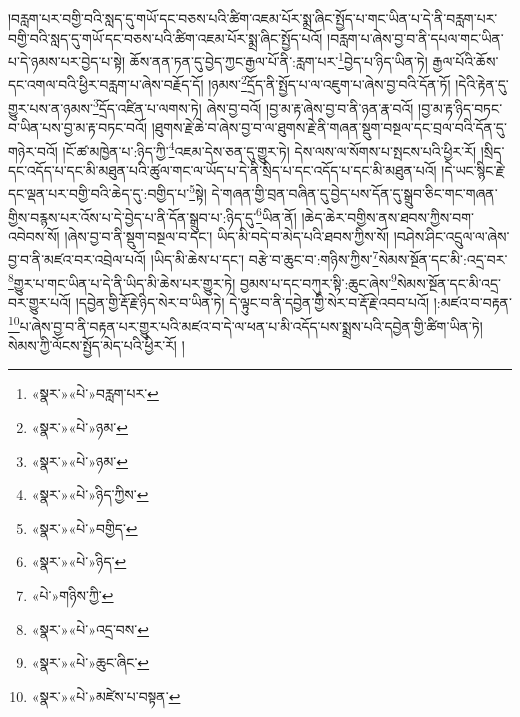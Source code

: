།བརླག་པར་བགྱི་བའི་སླད་དུ་གཡོ་དང་བཅས་པའི་ཚིག་འཇམ་པོར་སྨྲ་ཞིང་སྤྱོད་པ་གང་ཡིན་པ་དེ་ནི་བརླག་པར་བགྱི་བའི་སླད་དུ་གཡོ་དང་བཅས་པའི་ཚིག་འཇམ་པོར་སྨྲ་ཞིང་སྤྱོད་པའོ། །བརླག་པ་ཞེས་བྱ་བ་ནི་དཔལ་གང་ཡིན་པ་དེ་ཉམས་པར་བྱེད་པ་སྟེ། ཆོས་ནན་ཏན་དུ་བྱེད་ཀྱང་རྒྱལ་པོ་ནི་:རླག་པར་\footnote{«སྣར་»«པེ་»བརླག་པར་}བྱེད་པ་ཉིད་ཡིན་ཏེ། རྒྱལ་པོའི་ཆོས་དང་འགལ་བའི་ཕྱིར་བརླག་པ་ཞེས་བརྗོད་དོ། །ཉམས་\footnote{«སྣར་»«པེ་»ཉམ་}དྲོད་ནི་སྤྱོད་པ་ལ་འཇུག་པ་ཞེས་བྱ་བའི་དོན་ཏོ། །དེའི་རྟེན་དུ་གྱུར་པས་ན་ཉམས་\footnote{«སྣར་»«པེ་»ཉམ་}དྲོད་འཛིན་པ་ལགས་ཏེ། ཞེས་བྱ་བའོ། །བྱ་མ་རྟ་ཞེས་བྱ་བ་ནི་ཉན་རྣ་བའོ། །བྱ་མ་རྟ་ཉིད་བཏང་བ་ཡིན་པས་བྱ་མ་རྟ་བཏང་བའོ། །ཐུགས་རྗེ་ཆེ་བ་ཞེས་བྱ་བ་ལ་ཐུགས་རྗེ་ནི་གཞན་སྡུག་བསྔལ་དང་བྲལ་བའི་དོན་དུ་གཉེར་བའོ། །ངོ་ཚ་མཁྱེན་པ་:ཉིད་ཀྱི་\footnote{«སྣར་»«པེ་»ཉིད་ཀྱིས་}འཇམ་དེས་ཅན་དུ་གྱུར་ཏེ། དེས་ལས་ལ་སོགས་པ་སྤངས་པའི་ཕྱིར་རོ། །སྲིད་དང་འདོད་པ་དང་མི་མཐུན་པའི་ཚུལ་གང་ལ་ཡོད་པ་དེ་ནི་སྲིད་པ་དང་འདོད་པ་དང་མི་མཐུན་པའོ། །དེ་ཡང་སྙིང་རྗེ་དང་ལྡན་པར་བགྱི་བའི་ཆེད་དུ་:བགྱིད་པ་\footnote{«སྣར་»«པེ་»བགྱིད་}སྟེ། དེ་གཞན་གྱི་བྲན་བཞིན་དུ་བྱེད་པས་དོན་དུ་སྒྲུབ་ཅིང་གང་གཞན་གྱིས་བརྙས་པར་འོས་པ་དེ་བྱེད་པ་ནི་དོན་སྒྲུབ་པ་:ཉིད་དུ་\footnote{«སྣར་»«པེ་»ཉིད་}ཡིན་ནོ། །ཆེད་ཆེར་བགྱིས་ནས་ཐབས་ཀྱིས་བག་འབེབས་སོ། །ཞེས་བྱ་བ་ནི་སྡུག་བསྔལ་བ་དང་། ཡིད་མི་བདེ་བ་མེད་པའི་ཐབས་ཀྱིས་སོ། །བཤེས་ཤིང་འདྲུལ་ལ་ཞེས་བྱ་བ་ནི་མཛའ་བར་འབྲེལ་པའོ། །ཡིད་མི་ཆེས་པ་དང་། བརྩེ་བ་ཆུང་བ་:གཉིས་ཀྱིས་\footnote{«པེ་»གཉིས་ཀྱི་}སེམས་སྔོན་དང་མི་:འདྲ་བར་\footnote{«སྣར་»«པེ་»འདྲ་བས་}གྱུར་པ་གང་ཡིན་པ་དེ་ནི་ཡིད་མི་ཆེས་པར་གྱུར་ཏེ། བྱམས་པ་དང་བཀུར་སྟི་:ཆུང་ཞེས་\footnote{«སྣར་»«པེ་»ཆུང་ཞིང་}སེམས་སྔོན་དང་མི་འདྲ་བར་གྱུར་པའོ། །དབྱེན་གྱི་རྡོ་རྗེ་ཉིད་སེར་བ་ཡིན་ཏེ། དེ་ལྟུང་བ་ནི་དབྱེན་གྱི་སེར་བ་རྡོ་རྗེ་འབབ་པའོ། །:མཛའ་བ་བརྟན་\footnote{«སྣར་»«པེ་»མཛེས་པ་བསྟན་}པ་ཞེས་བྱ་བ་ནི་བརྟན་པར་གྱུར་པའི་མཛའ་བ་དེ་ལ་ཕན་པ་མི་འདོད་པས་སྨྲས་པའི་དབྱེན་གྱི་ཚིག་ཡིན་ཏེ། སེམས་ཀྱི་ལོངས་སྤྱོད་མེད་པའི་ཕྱིར་རོ། །
